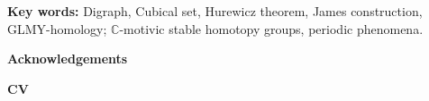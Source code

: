 \documentclass[12pt,a4paper]{report}
\theoremstyle{plain}
\theoremstyle{definition}
\newcommand{\C}{\mathbb{C}}
\begin{document}
{\bf Key words:} Digraph, Cubical set, Hurewicz theorem, James construction, GLMY-homology; $\C$-motivic stable homotopy groups, periodic phenomena.


\newpage
\thispagestyle{empty}
\mbox{}

\newpage
\thispagestyle{empty}
{\large {\tableofcontents}}

\newpage
{}







\newpage
{}
{}
\begin{center}
{\large {\bf Acknowledgements}}
\end{center}

\vspace{5mm}






\newpage
{}
{}
\begin{center}
	{\large {\bf CV}}
\end{center}

\vspace{5mm}


\end{document}
